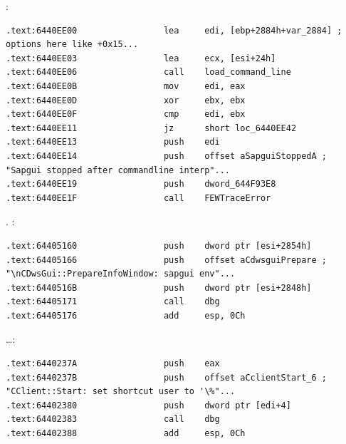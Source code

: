 :

\begin{lstlisting}
.text:6440EE00                 lea     edi, [ebp+2884h+var_2884] ; options here like +0x15...
.text:6440EE03                 lea     ecx, [esi+24h]
.text:6440EE06                 call    load_command_line
.text:6440EE0B                 mov     edi, eax
.text:6440EE0D                 xor     ebx, ebx
.text:6440EE0F                 cmp     edi, ebx
.text:6440EE11                 jz      short loc_6440EE42
.text:6440EE13                 push    edi
.text:6440EE14                 push    offset aSapguiStoppedA ; "Sapgui stopped after commandline interp"...
.text:6440EE19                 push    dword_644F93E8
.text:6440EE1F                 call    FEWTraceError
\end{lstlisting}

 .
:

\begin{lstlisting}
.text:64405160                 push    dword ptr [esi+2854h]
.text:64405166                 push    offset aCdwsguiPrepare ; "\nCDwsGui::PrepareInfoWindow: sapgui env"...
.text:6440516B                 push    dword ptr [esi+2848h]
.text:64405171                 call    dbg
.text:64405176                 add     esp, 0Ch
\end{lstlisting}

\dots \OrENRU:

\begin{lstlisting}
.text:6440237A                 push    eax
.text:6440237B                 push    offset aCclientStart_6 ; "CClient::Start: set shortcut user to '\%"...
.text:64402380                 push    dword ptr [edi+4]
.text:64402383                 call    dbg
.text:64402388                 add     esp, 0Ch
\end{lstlisting}

